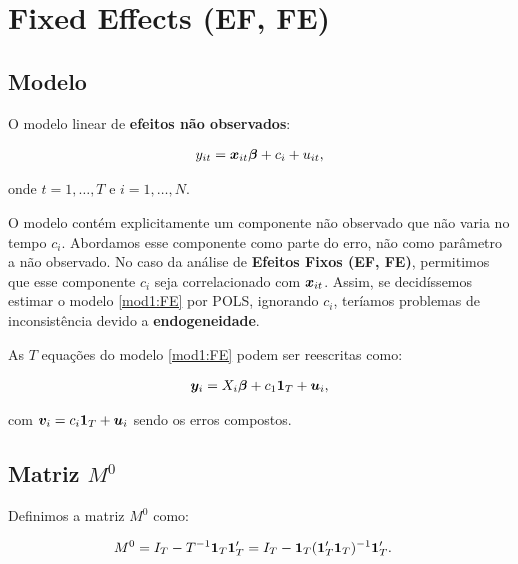 \documentclass[11pt, oneside, a4paper, article]{article}
\numberwithin{equation}{section}
\begin{document}
\clearpage
\section{Fixed Effects (EF, FE)}


\subsection*{Modelo}

O modelo linear de \textbf{efeitos não observados}:

\vspace{-1 em}
\begin{align} \label{mod1:FE}
	y_{it} = \boldsymbol{x}_{it} \boldsymbol{\beta} + c_{i} + u_{it},
\end{align}

\noindent
onde
$t = 1, \dots, T$ e $i = 1, \dots, N$.

O modelo contém explicitamente um componente não observado que não varia no tempo $c_{i}$.
Abordamos esse componente como parte do erro, não como parâmetro a não observado.
No caso da análise de \textbf{Efeitos Fixos (EF, FE)}, permitimos que esse componente $c_{i}$ seja correlacionado com $\boldsymbol{x}_{it}$.
Assim, se decidíssemos estimar o modelo \eqref{mod1:FE} por POLS, ignorando $c_{i}$, teríamos problemas de inconsistência devido a \textbf{endogeneidade}.

As $T$ equações do modelo \eqref{mod1:FE} podem ser reescritas como:

\vspace{-1 em}
\begin{align} \label{mod2:FE}
	\boldsymbol{y}_{i} = X_{i} \boldsymbol{\beta} + c_{1} \boldsymbol{1}_{T} + \boldsymbol{u}_{i},
\end{align}

\noindent
com
$\boldsymbol{v}_{i} = c_{i} \boldsymbol{1}_{T} + \boldsymbol{u}_{i}$ sendo os erros compostos.

\subsection*{Matriz $M^{0}$}

Definimos a matriz $M^{0}$ como:

\vspace{-1 em}
\begin{align*}
	M^{0} &=
	I_{T} - T^{-1} \boldsymbol{1}_{T} \boldsymbol{1}_{T}'
	=
	I_{T} - \boldsymbol{1}_{T} (\boldsymbol{1}_{T}' \boldsymbol{1}_{T})^{-1} \boldsymbol{1}_{T}'.
\end{align*}
\end{document}
